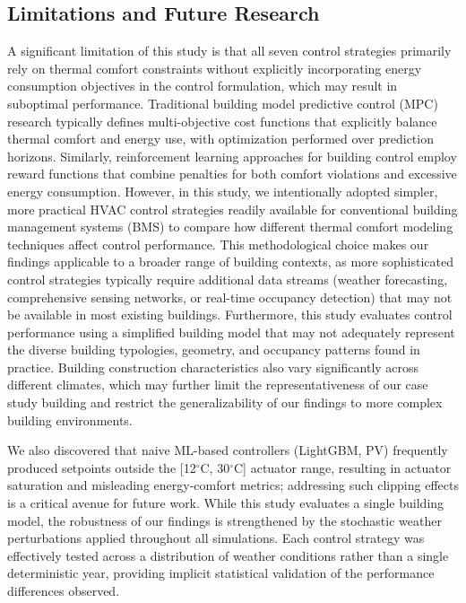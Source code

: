 \subsection{Limitations and Future Research}

A significant limitation of this study is that all seven control strategies primarily rely on thermal comfort constraints without explicitly incorporating energy consumption objectives in the control formulation, which may result in suboptimal performance. Traditional building model predictive control (MPC) research typically defines multi-objective cost functions that explicitly balance thermal comfort and energy use, with optimization performed over prediction horizons. 
Similarly, reinforcement learning approaches for building control employ reward functions that combine penalties for both comfort violations and excessive energy consumption. However, in this study, we intentionally adopted simpler, more practical HVAC control strategies readily available for conventional building management systems (BMS) to compare how different thermal comfort modeling techniques affect control performance. 
This methodological choice makes our findings applicable to a broader range of building contexts, as more sophisticated control strategies typically require additional data streams (weather forecasting, comprehensive sensing networks, or real-time occupancy detection) that may not be available in most existing buildings. 
Furthermore, this study evaluates control performance using a simplified building model that may not adequately represent the diverse building typologies, geometry, and occupancy patterns found in practice. Building construction characteristics also vary significantly across different climates, which may further limit the representativeness of our case study building and restrict the generalizability of our findings to more complex building environments. 

We also discovered that naive ML-based controllers (LightGBM, PV) frequently produced setpoints outside the [12$^\circ$C, 30$^\circ$C] actuator range, resulting in actuator saturation and misleading energy-comfort metrics; addressing such clipping effects is a critical avenue for future work. While this study evaluates a single building model, the robustness of our findings is strengthened by the stochastic weather perturbations applied throughout all simulations. Each control strategy was effectively tested across a distribution of weather conditions rather than a single deterministic year, providing implicit statistical validation of the performance differences observed.


